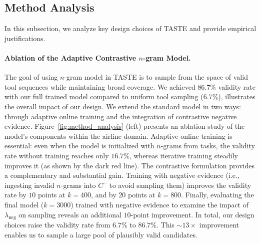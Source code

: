 \subsection{Method Analysis}
\label{sub:method_analysis}

In this subsection, we analyze key design choices of TASTE and provide empirical justifications. 

\paragraph{Ablation of the Adaptive Contrastive $n$-gram Model.} 
The goal of using $n$-gram model in TASTE is to sample from the space of valid tool sequences while maintaining broad coverage. We achieved $86.7\%$ validity rate with our full trained model compared to uniform tool sampling ($6.7\%$), illustrates the overall impact of our design.
We extend the standard model in two ways: through adaptive online training and the integration of contrastive negative evidence. Figure~\ref{fig:method_analysis} (left) presents an ablation study of the model's components within the airline domain. Adaptive online training is essential: even when the model is initialized with $n$-grams from \tbv tasks, the validity rate without training reaches only $16.7\%$, whereas iterative training steadily improves it (as shown by the dark red line). The contrastive formulation provides a complementary and substantial gain. Training with negative evidence (i.e., ingesting invalid $n$-grams into $C^-$ to avoid sampling them) improves the validity rate by $10$ points at $k\!=\!400$, and by $20$ points at $k=800$. Finally, evaluating the final model ($k\!=\!3000$) trained with negative evidence to examine the impact of $\lambda_{\text{neg}}$ on sampling reveals an additional $10$-point improvement. In total, our design choices raise the validity rate from $6.7\%$ to $86.7\%$. This ${\sim}\!13{\times}$ improvement enables us to sample a large pool of plausibly valid candidates.

